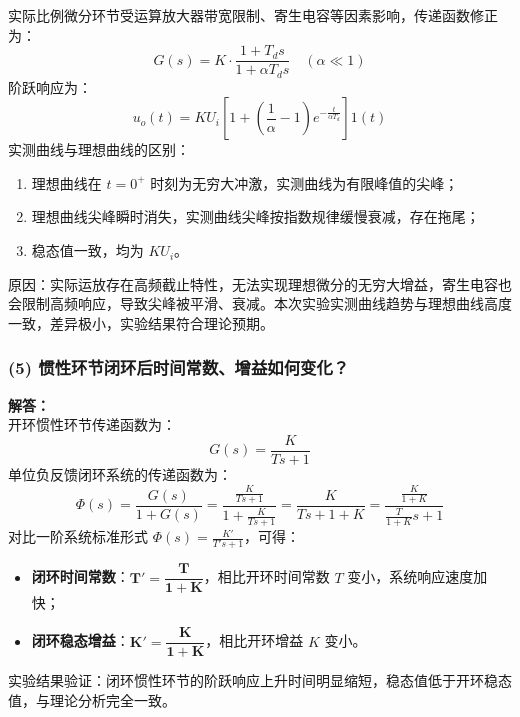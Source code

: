 \documentclass[12pt,a4paper,UTF8]{article}
\begin{document}
实际比例微分环节受运算放大器带宽限制、寄生电容等因素影响，传递函数修正为：
\[
G(s) = K \cdot \frac{1+T_d s}{1+\alpha T_d s} \quad (\alpha \ll 1)
\]
阶跃响应为：
\[
u_o(t) = KU_i \left[ 1 + \left( \frac{1}{\alpha} - 1 \right) e^{-\frac{t}{\alpha T_d}} \right] 1(t)
\]
实测曲线与理想曲线的区别：
\begin{enumerate}
\item 理想曲线在 $t=0^+$ 时刻为无穷大冲激，实测曲线为有限峰值的尖峰；
\item 理想曲线尖峰瞬时消失，实测曲线尖峰按指数规律缓慢衰减，存在拖尾；
\item 稳态值一致，均为 $KU_i$。
\end{enumerate}
原因：实际运放存在高频截止特性，无法实现理想微分的无穷大增益，寄生电容也会限制高频响应，导致尖峰被平滑、衰减。本次实验实测曲线趋势与理想曲线高度一致，差异极小，实验结果符合理论预期。

\subsubsection*{(5) 惯性环节闭环后时间常数、增益如何变化？}
\textbf{解答：}\\
开环惯性环节传递函数为：
\[
G(s) = \frac{K}{Ts+1}
\]
单位负反馈闭环系统的传递函数为：
\[
\Phi(s) = \frac{G(s)}{1+G(s)} = \frac{\frac{K}{Ts+1}}{1+\frac{K}{Ts+1}} = \frac{K}{Ts+1+K} = \frac{\frac{K}{1+K}}{\frac{T}{1+K}s + 1}
\]
对比一阶系统标准形式 $\Phi(s) = \frac{K'}{T's+1}$，可得：
\begin{itemize}
\item \textbf{闭环时间常数}：$\boldsymbol{T' = \dfrac{T}{1+K}}$，相比开环时间常数 $T$ 变小，系统响应速度加快；
\item \textbf{闭环稳态增益}：$\boldsymbol{K' = \dfrac{K}{1+K}}$，相比开环增益 $K$ 变小。
\end{itemize}
实验结果验证：闭环惯性环节的阶跃响应上升时间明显缩短，稳态值低于开环稳态值，与理论分析完全一致。
\end{document}

